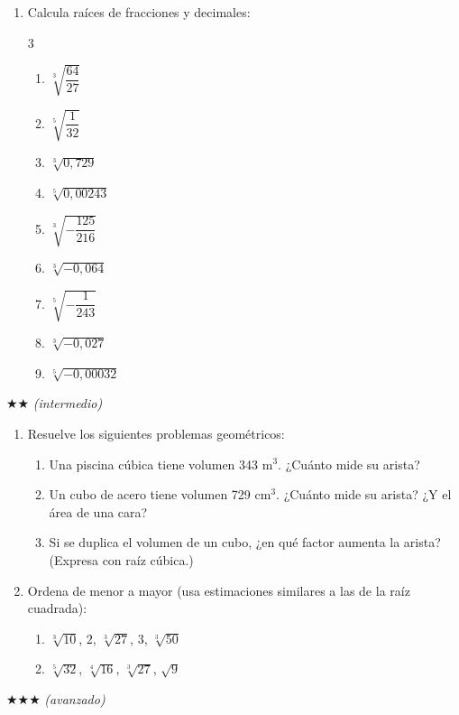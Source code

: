 \documentclass[11pt, letterpaper]{article}
\begin{document}
\begin{enumerate}[label=\textbf{\arabic*.}, leftmargin=*]
  \item Calcula raíces de fracciones y decimales:
  \begin{multicols}{3}
  \begin{enumerate}[label=\alph*)]
    \item $\sqrt[3]{\dfrac{64}{27}}$
    \item $\sqrt[5]{\dfrac{1}{32}}$
    \item $\sqrt[3]{0{,}729}$
    \item $\sqrt[5]{0{,}00243}$
    \item $\sqrt[3]{-\dfrac{125}{216}}$
    \item $\sqrt[3]{-0{,}064}$
    \item $\sqrt[5]{-\dfrac{1}{243}}$
    \item $\sqrt[3]{-0{,}027}$
    \item $\sqrt[5]{-0{,}00032}$
  \end{enumerate}
  \end{multicols}
\end{enumerate}

$\bigstar\bigstar$ \textit{(intermedio)}

\begin{enumerate}[label=\textbf{\arabic*.}, leftmargin=*, resume]
  \item Resuelve los siguientes problemas geométricos:
  \begin{enumerate}[label=\alph*)]
    \item Una piscina cúbica tiene volumen 343 m$^3$. ¿Cuánto mide su arista?
    \item Un cubo de acero tiene volumen 729 cm$^3$. ¿Cuánto mide su arista? ¿Y el área de una cara?
    \item Si se duplica el volumen de un cubo, ¿en qué factor aumenta la arista? (Expresa con raíz cúbica.)
  \end{enumerate}

  \item Ordena de menor a mayor (usa estimaciones similares a las de la raíz cuadrada):
  \begin{enumerate}[label=\alph*)]
    \item $\sqrt[3]{10}$, $2$, $\sqrt[3]{27}$, $3$, $\sqrt[3]{50}$
    \item $\sqrt[5]{32}$, $\sqrt[4]{16}$, $\sqrt[3]{27}$, $\sqrt{9}$
  \end{enumerate}
\end{enumerate}

$\bigstar\bigstar\bigstar$ \textit{(avanzado)}
\end{document}
